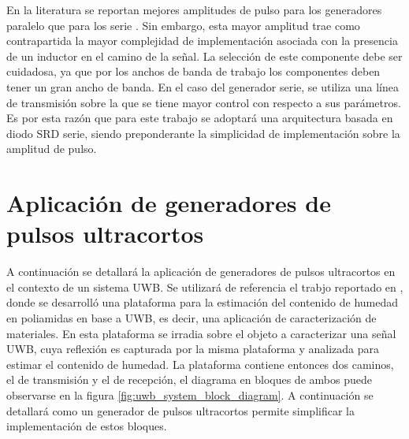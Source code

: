 En la literatura se reportan mejores amplitudes de pulso para los generadores
paralelo que para los serie \cite{han2005}. Sin embargo, esta mayor amplitud
trae como contrapartida la mayor complejidad de implementación asociada con la
presencia de un inductor en el camino de la señal. La selección de este
componente debe ser cuidadosa, ya que por los anchos de banda de trabajo los
componentes deben tener un gran ancho de banda. En el caso del generador serie,
se utiliza una línea de transmisión sobre la que se tiene mayor control con
respecto a sus parámetros. Es por esta razón que para este trabajo se adoptará
una arquitectura basada en diodo SRD serie, siendo preponderante la simplicidad
de implementación sobre la amplitud de pulso.

\section{Aplicación de generadores de pulsos ultracortos}

A continuación se detallará la aplicación de generadores de pulsos ultracortos
en el contexto de un sistema UWB. Se utilizará de referencia el trabjo reportado
en \cite{Altieri2021}, donde se desarrolló una plataforma para la estimación del
contenido de humedad en poliamidas en base a UWB, es decir, una aplicación de
caracterización de materiales. En esta plataforma se irradia sobre el objeto a
caracterizar una señal UWB, cuya reflexión es capturada por la misma plataforma
y analizada para estimar el contenido de humedad. La plataforma contiene
entonces dos caminos, el de transmisión y el de recepción, el diagrama en
bloques de ambos puede observarse en la figura
\ref{fig:uwb_system_block_diagram}. A continuación se detallará como un
generador de pulsos ultracortos permite simplificar la implementación de estos
bloques.

